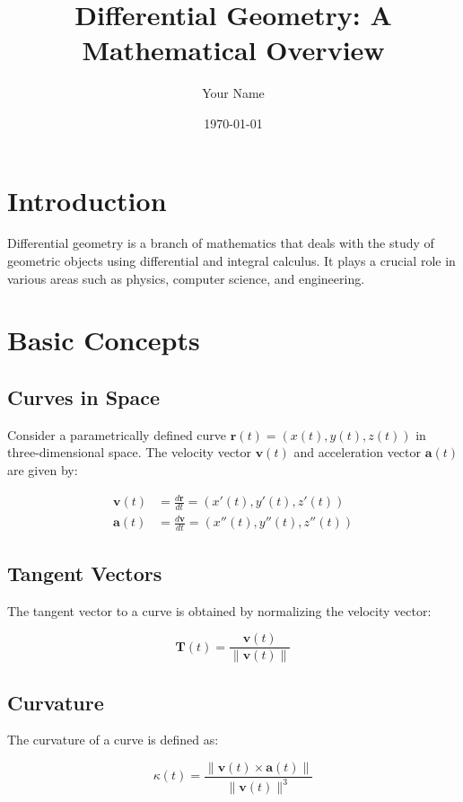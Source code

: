 \documentclass{article}
\title{Differential Geometry: A Mathematical Overview}
\author{Your Name}
\date{\today}
\begin{document}
\maketitle

\section{Introduction}

Differential geometry is a branch of mathematics that deals with the study of geometric objects using differential and integral calculus. It plays a crucial role in various areas such as physics, computer science, and engineering.

\section{Basic Concepts}

\subsection{Curves in Space}

Consider a parametrically defined curve $\mathbf{r}(t) = (x(t), y(t), z(t))$ in three-dimensional space. The velocity vector $\mathbf{v}(t)$ and acceleration vector $\mathbf{a}(t)$ are given by:

\begin{align}
    \mathbf{v}(t) &= \frac{d\mathbf{r}}{dt} = (x'(t), y'(t), z'(t)) \\
    \mathbf{a}(t) &= \frac{d\mathbf{v}}{dt} = (x''(t), y''(t), z''(t))
\end{align}

\subsection{Tangent Vectors}

The tangent vector to a curve is obtained by normalizing the velocity vector:

\begin{equation}
    \mathbf{T}(t) = \frac{\mathbf{v}(t)}{\|\mathbf{v}(t)\|}
\end{equation}

\subsection{Curvature}

The curvature of a curve is defined as:

\begin{equation}
    \kappa(t) = \frac{\|\mathbf{v}(t) \times \mathbf{a}(t)\|}{\|\mathbf{v}(t)\|^3}
\end{equation}
\end{document}
